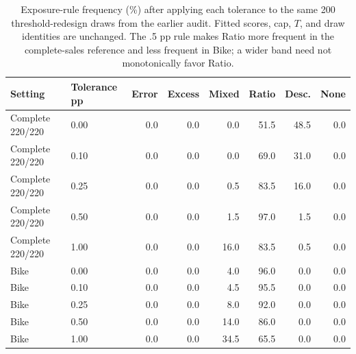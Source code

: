 \begin{table}[t]\centering\scriptsize
\caption{Exposure-rule frequency (\%) after applying each tolerance to the same 200 threshold-redesign draws from the earlier audit. Fitted scores, cap, $T$, and draw identities are unchanged. The .5 pp rule makes Ratio more frequent in the complete-sales reference and less frequent in Bike; a wider band need not monotonically favor Ratio.}\label{tab:v8-tolerance-frequency}
\begin{tabular}{llrrrrrr}\toprule
Setting & Tolerance pp & Error & Excess & Mixed & Ratio & Desc. & None\\\midrule
Complete 220/220 & 0.00 & 0.0 & 0.0 & 0.0 & 51.5 & 48.5 & 0.0 \\
Complete 220/220 & 0.10 & 0.0 & 0.0 & 0.0 & 69.0 & 31.0 & 0.0 \\
Complete 220/220 & 0.25 & 0.0 & 0.0 & 0.5 & 83.5 & 16.0 & 0.0 \\
Complete 220/220 & 0.50 & 0.0 & 0.0 & 1.5 & 97.0 & 1.5 & 0.0 \\
Complete 220/220 & 1.00 & 0.0 & 0.0 & 16.0 & 83.5 & 0.5 & 0.0 \\
Bike & 0.00 & 0.0 & 0.0 & 4.0 & 96.0 & 0.0 & 0.0 \\
Bike & 0.10 & 0.0 & 0.0 & 4.5 & 95.5 & 0.0 & 0.0 \\
Bike & 0.25 & 0.0 & 0.0 & 8.0 & 92.0 & 0.0 & 0.0 \\
Bike & 0.50 & 0.0 & 0.0 & 14.0 & 86.0 & 0.0 & 0.0 \\
Bike & 1.00 & 0.0 & 0.0 & 34.5 & 65.5 & 0.0 & 0.0 \\
\bottomrule\end{tabular}\end{table}
